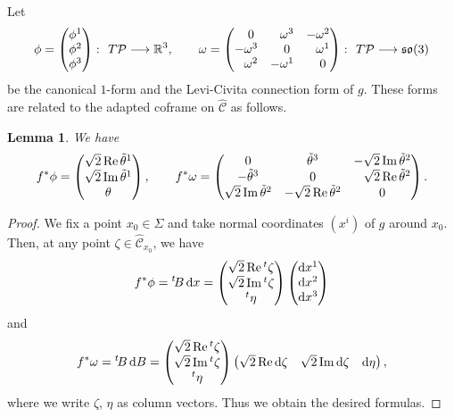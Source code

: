 \documentclass[11pt]{article}
\numberwithin{equation}{section}
\newcommand\ol{\overline}
\newcommand{\wh}{\widehat}
\numberwithin{equation}{section}
\newtheorem{Lemma}[Theorem]{Lemma}
\begin{document}
Let
\[
\phi=\begin{pmatrix}
\phi^1 \\ \phi^2 \\ \phi^3
\end{pmatrix}
\colon\ T\mathcal{P}\longrightarrow \mathbb{R}^3, \qquad \omega=\begin{pmatrix}
\hphantom{-}0 & \hphantom{-}\omega^3 & -\omega^2 \\
-\omega^3 & \hphantom{-}0 & \hphantom{-}\omega^1 \\
\hphantom{-}\omega^2 & -\omega^1 & \hphantom{-}0
\end{pmatrix}
\colon\ T\mathcal{P}\longrightarrow \mathfrak{so}(3)
\]
be the canonical $1$-form and the Levi-Civita connection form of $g$.
These forms are related to the adapted coframe \smash{$\bigl\{\theta, \tilde\theta^1, \tilde\theta^2, \tilde\theta^{\ol1}, \tilde\theta^{\ol2}, \tilde\theta^3\bigr\}$} on $\wh{\mathcal{C}}$ as follows.
\begin{Lemma}
We have
\[
f^*\phi=
\begin{pmatrix}
\sqrt{2}\operatorname{Re}\tilde\theta^1 \\
\sqrt{2}\operatorname{Im}\tilde\theta^1 \\
\theta
\end{pmatrix}, \qquad
f^*\omega=\begin{pmatrix}
0 & \tilde\theta^3 & -\sqrt{2}\operatorname{Im}\tilde\theta^2 \\
-\tilde\theta^3 & 0 & \hphantom{-}\sqrt{2}\operatorname{Re}\tilde\theta^2 \\
\sqrt{2}\operatorname{Im}\tilde\theta^2 & -\sqrt{2}\operatorname{Re}\tilde\theta^2& 0
\end{pmatrix}.
\]
\end{Lemma}
\begin{proof}
We fix a point $x_0\in\Sigma$ and take normal coordinates $(x^i)$ of $g$ around
$x_0$. Then, at any point $\zeta\in \wh{\mathcal{C}}_{x_0}$, we have
\[
f^*\phi={}^t \!B\, {\rm d}x =\begin{pmatrix}
\sqrt{2}\operatorname{Re}{}^t\zeta \\
\sqrt{2}\operatorname{Im}{}^t\zeta \\
{}^t\eta
\end{pmatrix}
\begin{pmatrix}
{\rm d}x^1 \\ {\rm d}x^2 \\ {\rm d}x^3
\end{pmatrix}
\]
and
\[
f^*\omega={}^t\!B\,{\rm d}B=
\begin{pmatrix}
\sqrt{2}\operatorname{Re}{}^t\zeta \\
\sqrt{2}\operatorname{Im}{}^t\zeta \\
{}^t\eta
\end{pmatrix}
\begin{pmatrix}
\sqrt{2}\operatorname{Re}{\rm d}\zeta & \sqrt{2}\operatorname{Im} {\rm d}\zeta & {\rm d}\eta
\end{pmatrix},
\]
where we write $\zeta$, $\eta$ as column vectors. Thus we obtain the desired formulas.
\end{proof}
\end{document}
